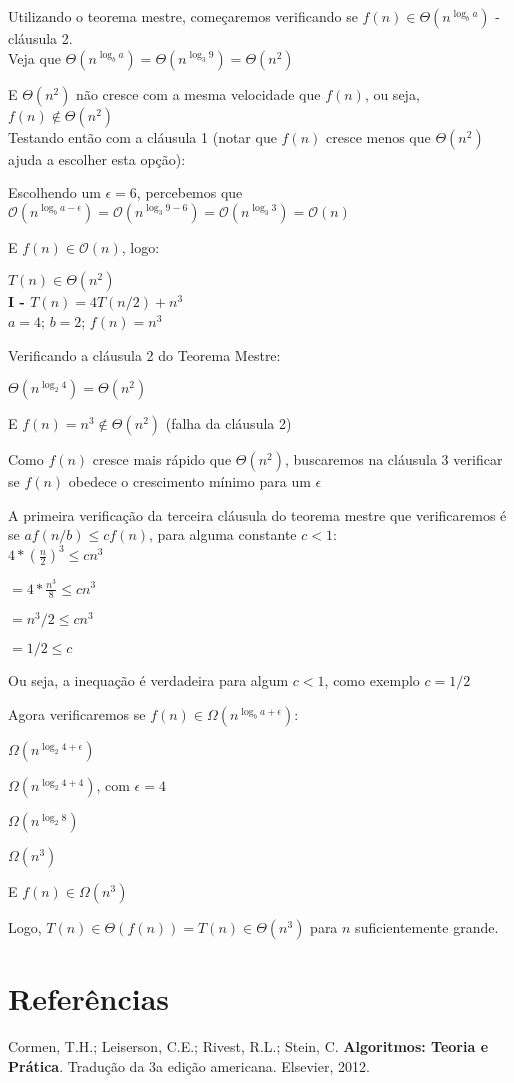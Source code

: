 \documentclass[a4paper, twocolumn]{article}
\theoremstyle{definition}
\begin{document}
	Utilizando o teorema mestre, começaremos verificando se $f(n) \in \Theta(n^{\log_b a})$ - cláusula 2. \\

	Veja que $\Theta(n^{\log_b a}) = \Theta(n^{\log_3 9}) = \Theta(n^2)$
	
	E $\Theta(n^2)$ não cresce com a mesma velocidade que $f(n)$, ou seja, $f(n) \notin \Theta(n^2)$ \\
	
	Testando então com a cláusula 1 (notar que $f(n)$ cresce menos que $\Theta(n^2)$ ajuda a escolher esta opção):
	
	Escolhendo um $\epsilon = 6$, percebemos que 
	$\mathcal{O}(n^{\log_b a-\epsilon}) = \mathcal{O}(n^{\log_3 9-6}) = \mathcal{O}(n^{\log_3 3}) = \mathcal{O}(n)$
	
	E $f(n) \in \mathcal{O}(n)$, logo:
	
	$T(n) \in \Theta(n^2)$ \\
	
	
	\textbf{I - $T(n) = 4T(n/2)+ n^3$} \\
	
	$a = 4$;
	$b = 2$;
	$f(n) = n^3$ 
	
	Verificando a cláusula 2 do Teorema Mestre:
	
	$\Theta(n^{\log_2 4}) = \Theta(n^{2})$
	
	E $f(n) = n^3 \notin \Theta(n^{2})$ (falha da cláusula 2)
	
	Como $f(n)$ cresce mais rápido que $\Theta(n^{2})$, buscaremos na cláusula 3 verificar se $f(n)$ obedece o crescimento mínimo para um $\epsilon$
	
	A primeira verificação da terceira cláusula do teorema mestre que verificaremos é se $af(n/b) \leq cf(n)$, para alguma constante $c < 1$: \\
	
	$4*(\frac{n}{2})^3 \leq cn^3$

	$= 4*\frac{n^3}{8} \leq cn^3$

	$= n^3/2 \leq cn^3$

	$= 1/2 \leq c$

	Ou seja, a inequação é verdadeira para algum $c < 1$, como exemplo $c=1/2$
	
	Agora verificaremos se $f(n) \in \Omega(n^{\log_b a + \epsilon})$:
	
	$\Omega(n^{\log_2 4 + \epsilon})$

	$\Omega(n^{\log_2 4 + 4})$, com $\epsilon = 4$

	$\Omega(n^{\log_2 8})$

	$\Omega(n^{3})$
	
	E $f(n) \in \Omega(n^{3})$
	
	Logo, $T(n) \in \Theta(f(n)) = T(n) \in \Theta(n^3)$ para $n$ suficientemente grande.
	
	
	\section{Referências}
	Cormen, T.H.; Leiserson, C.E.; Rivest, R.L.; Stein, C. \textbf{Algoritmos: Teoria e Prática}. Tradução da 3a edição americana. Elsevier, 2012.   
\end{document}
